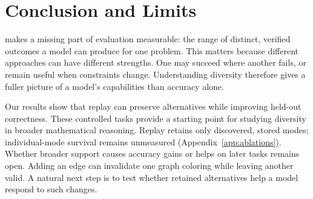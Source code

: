 \section{Conclusion and Limits}
\label{sec:conclusion}\label{sec:discussion}\label{sec:limitations}
\mb{} makes a missing part of evaluation measurable: the range of distinct,
verified outcomes a model can produce for one problem. This matters because
different approaches can have different strengths. One may succeed where
another fails, or remain useful when constraints change. Understanding diversity
therefore gives a fuller picture of a model's capabilities than accuracy alone.

Our results show that replay can preserve alternatives while improving
held-out correctness. These controlled tasks provide a starting point for
studying diversity in broader mathematical reasoning. Replay retains only discovered,
stored modes; individual-mode survival remains unmeasured
(Appendix~\ref{app:ablations}). Whether broader support causes accuracy gains or
helps on later tasks remains open. Adding an edge can invalidate one graph
coloring while leaving another valid. A natural next step is to test whether
retained alternatives help a model respond to such changes.

\label{main:lastpage}
\clearpage


\clearpage
\appendix


